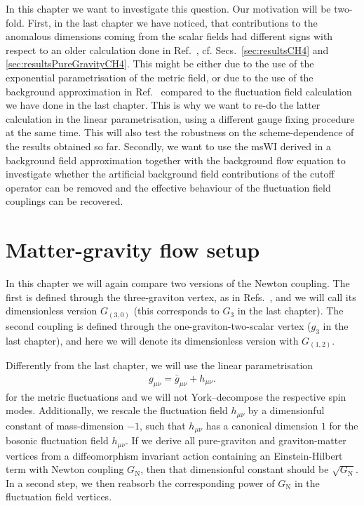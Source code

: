 \documentclass[11pt]{book}
\newcommand\GNewton{ G_{\scriptscriptstyle{\mathrm{N}}}{} }
\numberwithin{equation}{chapter}
\begin{document}
In this chapter we want to investigate this question. Our motivation will be two-fold.
First, in the last chapter we have noticed, that contributions to the anomalous dimensions
coming from the scalar fields had different signs with respect to an older calculation done
in Ref.~\cite{Dona:2013qba}, cf. Secs.~\ref{sec:resultsCH4} and
\ref{sec:resultsPureGravityCH4}.
This might be either due to the use of the exponential parametrisation of the metric field,
or due to the use of the background
approximation in Ref.~\cite{Dona:2013qba} compared to the fluctuation field calculation
we have done in the last chapter. This is why we want to re-do the latter calculation in
the linear parametrisation, using a different gauge fixing procedure at the same time.
This will also test the robustness on the scheme-dependence of the results obtained so far.
Secondly, we want to use the msWI derived in a background field approximation together
with the background flow equation to investigate whether the artificial background field
contributions of the cutoff operator can be removed and the effective behaviour of the
fluctuation field couplings can be recovered.


\section{Matter-gravity flow setup}

In this chapter we will again compare two versions of the Newton coupling.
The first is defined through the three-graviton vertex,
as in Refs.~\cite{Christiansen:2015rva, Meibohm:2015twa},
and we will call its dimensionless version $G_{(3,0)}$
(this corresponds to $G_3$ in the last chapter).
The second coupling is defined through the one-graviton-two-scalar vertex
($g_3$ in the last chapter),
and here we will denote its dimensionless version with $G_{(1,2)}$.

Differently from the last chapter, we will use the linear parametrisation
\begin{align}\label{eq:linpara}
  g_{\mu \nu}=\bar g_{\mu \nu}+h_{\mu \nu}.
\end{align}
for the metric fluctuations and we will not York--decompose the respective
spin modes.
Additionally, we rescale the fluctuation field $h_{\mu\nu}$ by a dimensionful constant of mass-dimension $-1$,
such that $h_{\mu\nu}$ has a canonical dimension $1$ for the bosonic fluctuation field $h_{\mu \nu}$.
If we derive all pure-graviton and graviton-matter vertices from a diffeomorphism invariant action
containing an Einstein-Hilbert term with Newton coupling $\GNewton$,
then that dimensionful constant should be $\sqrt{\GNewton}$.
In a second step, we then reabsorb the corresponding power of $\GNewton$
in the fluctuation field vertices.
\end{document}
